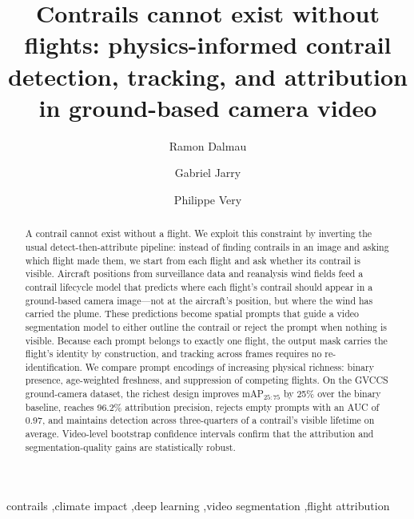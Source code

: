 \documentclass[review]{elsarticle}
\begin{document}
\begin{frontmatter}

\title{Contrails cannot exist without flights: physics-informed contrail detection, tracking, and attribution in ground-based camera video}

\author[ec]{Ramon Dalmau}
\author[ec]{Gabriel Jarry}
\author[ec]{Philippe Very}

\begin{abstract}
A contrail cannot exist without a flight. We exploit this constraint by inverting the usual detect-then-attribute pipeline: instead of finding contrails in an image and asking which flight made them, we start from each flight and ask whether its contrail is visible. Aircraft positions from surveillance data and reanalysis wind fields feed a contrail lifecycle model that predicts where each flight's contrail should appear in a ground-based camera image---not at the aircraft's position, but where the wind has carried the plume. These predictions become spatial prompts that guide a video segmentation model to either outline the contrail or reject the prompt when nothing is visible. Because each prompt belongs to exactly one flight, the output mask carries the flight's identity by construction, and tracking across frames requires no re-identification. We compare prompt encodings of increasing physical richness: binary presence, age-weighted freshness, and suppression of competing flights. On the GVCCS ground-camera dataset, the richest design improves mAP$_{25:75}$ by 25\% over the binary baseline, reaches 96.2\% attribution precision, rejects empty prompts with an AUC of 0.97, and maintains detection across three-quarters of a contrail's visible lifetime on average. Video-level bootstrap confidence intervals confirm that the attribution and segmentation-quality gains are statistically robust.
\end{abstract}

\begin{keyword}
contrails \sep climate impact \sep deep learning \sep video segmentation \sep flight attribution
\end{keyword}

\end{frontmatter}
\end{document}
